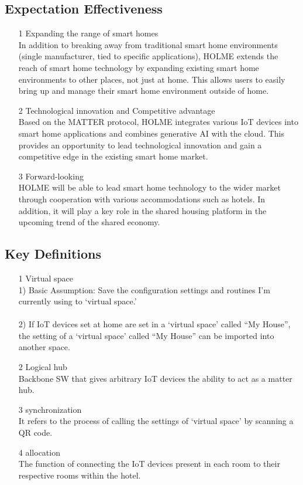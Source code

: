 \documentclass[conference]{IEEEtran}
\begin{document}
\subsection{Expectation Effectiveness}
\begin{itemize}
\item [1] Expanding the range of smart homes\\
In addition to breaking away from traditional smart home environments (single manufacturer, tied to specific applications), HOLME extends the reach of smart home technology by expanding existing smart home environments to other places, not just at home. This allows users to easily bring up and manage their smart home environment outside of home.
\\
\item [2] Technological innovation and Competitive advantage\\
Based on the MATTER protocol, HOLME integrates various IoT devices into smart home applications and combines generative AI with the cloud. This provides an opportunity to lead technological innovation and gain a competitive edge in the existing smart home market.
\\
\item [3] Forward-looking\\
HOLME will be able to lead smart home technology to the wider market through cooperation with various accommodations such as hotels. In addition, it will play a key role in the shared housing platform in the upcoming trend of the shared economy.
\\
\end{itemize}

\subsection{Key Definitions}
\begin{itemize}
\item [1] Virtual space\\
1) Basic Assumption: Save the configuration settings and routines I'm currently using to `virtual space.’\\\\
2) If IoT devices set at home are set in a `virtual space’ called ``My House'', the setting of a `virtual space’ called ``My House'' can be imported into another space.
\\
\item [2] Logical hub\\
Backbone SW that gives arbitrary IoT devices the ability to act as a matter hub.
\\
\item [3] synchronization\\
It refers to the process of calling the settings of `virtual space' by scanning a QR code.
\\
\item [4] allocation\\
The function of connecting the IoT devices present in each room to their respective rooms within the hotel.
\\
\end{itemize}
\end{document}
